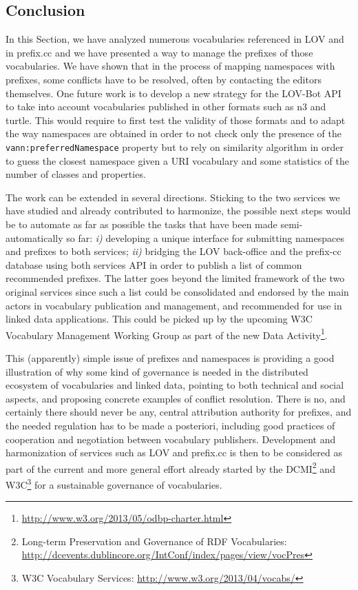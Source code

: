 \subsection{Conclusion}    \label{sec:conclusion}
In this Section, we have analyzed numerous vocabularies referenced in LOV and in prefix.cc and we have presented a way to manage the prefixes of those vocabularies. We have shown that in the process of mapping namespaces with prefixes, some conflicts have to be resolved, often by contacting the editors themselves. One future work is to develop a new strategy for the LOV-Bot API to take into account vocabularies published in other formats such as n3 and turtle. This would require to first test the validity of those formats and to adapt the way namespaces are obtained in order to not check only the presence of the \texttt{vann:preferredNamespace} property but to rely on similarity algorithm in order to guess the closest namespace given a URI vocabulary and some statistics of the number of classes and properties.

The work can be extended in several directions. Sticking to the two services we have studied and already contributed to harmonize, the possible next steps would be to automate as far as possible the tasks that have been made semi-automatically so far: \emph{i)} developing a unique interface for submitting namespaces and prefixes to both services; \emph{ii)} bridging the LOV back-office and the prefix-cc database using both services API in order to publish a list of common recommended prefixes. The latter goes beyond the limited framework of the two original services since such a list could be consolidated and endorsed by the main actors in vocabulary publication and management, and recommended for use in linked data applications. This could be picked up by the upcoming W3C Vocabulary Management Working Group as part of the new Data Activity\footnote{\url{http://www.w3.org/2013/05/odbp-charter.html}}.
 
This (apparently) simple issue of prefixes and namespaces is providing a good illustration of why some kind of governance is needed in the distributed ecosystem of vocabularies and linked data, pointing to both technical and social aspects, and proposing concrete examples of conflict resolution. There is no, and certainly there should never be any, central attribution authority for prefixes, and the needed regulation has to be made a posteriori, including good practices of cooperation and negotiation between vocabulary publishers. Development and harmonization of services such as LOV and prefix.cc is then to be considered as part of the current and more general effort already started by the DCMI\footnote{Long-term Preservation and Governance of RDF Vocabularies: \url{http://dcevents.dublincore.org/IntConf/index/pages/view/vocPres}} and W3C\footnote{W3C Vocabulary Services: \url{http://www.w3.org/2013/04/vocabs/}} for a sustainable governance of vocabularies.

